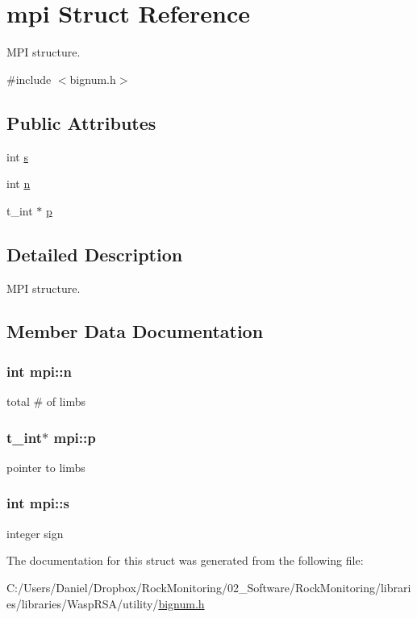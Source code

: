 \hypertarget{structmpi}{}\section{mpi Struct Reference}
\label{structmpi}


M\+PI structure.  




{\ttfamily \#include $<$bignum.\+h$>$}

\subsection*{Public Attributes}
\begin{DoxyCompactItemize}
\item 
int \hyperlink{structmpi_ad44e921903bdc7fcc1cadad14784a59a}{s}
\item 
int \hyperlink{structmpi_a8f796bf23cfbc90a47967e8660e6407b}{n}
\item 
t\+\_\+int $\ast$ \hyperlink{structmpi_a916c18d49e48f88fe79b05ce1017b959}{p}
\end{DoxyCompactItemize}


\subsection{Detailed Description}
M\+PI structure. 

\subsection{Member Data Documentation}
\subsubsection[{\texorpdfstring{n}{n}}]{\setlength{\rightskip}{0pt plus 5cm}int mpi\+::n}\hypertarget{structmpi_a8f796bf23cfbc90a47967e8660e6407b}{}\label{structmpi_a8f796bf23cfbc90a47967e8660e6407b}
total \# of limbs 
\subsubsection[{\texorpdfstring{p}{p}}]{\setlength{\rightskip}{0pt plus 5cm}t\+\_\+int$\ast$ mpi\+::p}\hypertarget{structmpi_a916c18d49e48f88fe79b05ce1017b959}{}\label{structmpi_a916c18d49e48f88fe79b05ce1017b959}
pointer to limbs 
\subsubsection[{\texorpdfstring{s}{s}}]{\setlength{\rightskip}{0pt plus 5cm}int mpi\+::s}\hypertarget{structmpi_ad44e921903bdc7fcc1cadad14784a59a}{}\label{structmpi_ad44e921903bdc7fcc1cadad14784a59a}
integer sign 

The documentation for this struct was generated from the following file\+:\begin{DoxyCompactItemize}
\item 
C\+:/\+Users/\+Daniel/\+Dropbox/\+Rock\+Monitoring/02\+\_\+\+Software/\+Rock\+Monitoring/libraries/libraries/\+Wasp\+R\+S\+A/utility/\hyperlink{bignum_8h}{bignum.\+h}\end{DoxyCompactItemize}

